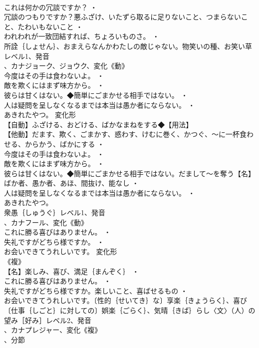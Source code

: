 \documentclass[8pt]{extreport}
\begin{document}
\begin{CJK}{UTF8}{min}
\\	これは何かの冗談ですか？ ・
\\	冗談のつもりですか？悪ふざけ、いたずら取るに足りないこと、つまらないこと、たわいもないこと ・
\\	われわれが一致団結すれば、ちょろいものさ。 ・
\\	所詮｛しょせん｝、おまえらなんかわたしの敵じゃない。物笑いの種、お笑い草レベル1、発音
\\	、カナジョーク、ジョウク、変化《動》
\\	今度はその手は食わないよ。 ・
\\	敵を欺くにはまず味方から。 ・
\\	彼らは甘くはない。◆簡単にごまかせる相手ではない。 ・
\\	人は疑問を呈しなくなるまでは本当は愚か者にならない。 ・
\\	あきれたやつ。	変化形 
\\	【自動】ふざける、おどける、ばかなまねをする◆【用法】
\\	【他動】だます、欺く、ごまかす、惑わす、けむに巻く、かつぐ、～に一杯食わせる、からかう、ばかにする ・
\\	今度はその手は食わないよ。 ・
\\	敵を欺くにはまず味方から。 ・
\\	彼らは甘くはない。◆簡単にごまかせる相手ではない。だまして～を奪う【名】ばか者、愚か者、あほ、間抜け、能なし ・
\\	人は疑問を呈しなくなるまでは本当は愚か者にならない。 ・
\\	あきれたやつ。
\\	衆愚｛しゅうぐ｝レベル1、発音
\\	、カナフール、変化《動》
\\	これに勝る喜びはありません。 ・
\\	失礼ですがどちら様ですか。 ・
\\	お会いできてうれしいです。	変化形 
\\	《複》
\\	【名】楽しみ、喜び、満足｛まんぞく｝ ・
\\	これに勝る喜びはありません。 ・
\\	失礼ですがどちら様ですか。楽しいこと、喜ばせるもの ・
\\	お会いできてうれしいです。〔性的｛せいてき｝な〕享楽｛きょうらく｝、喜び〔仕事｛しごと｝に対しての〕娯楽｛ごらく｝、気晴｛きば｝らし〈文〉（人）の望み［好み］レベル2、発音
\\	、カナプレジャー、変化《複》
\\	、分節

\end{CJK}
\end{document}
